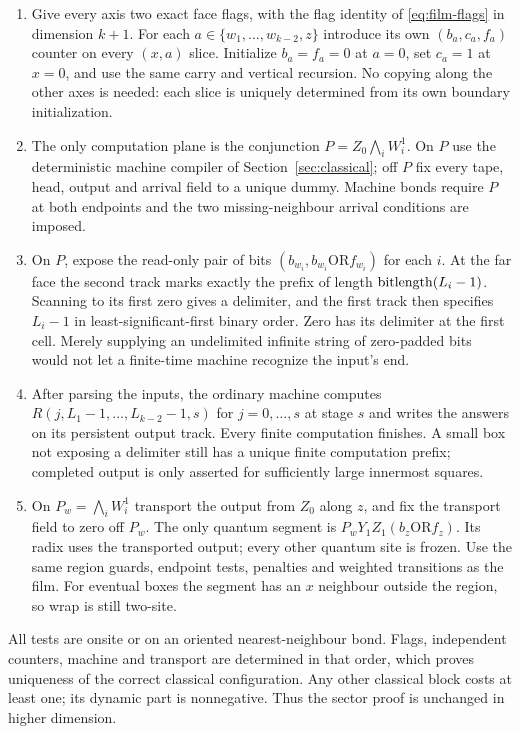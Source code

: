 \begin{enumerate}
\item Give every axis two exact face flags, with the flag identity
of \eqref{eq:film-flags} in dimension $k+1$. For each
$a\in\{w_1,\ldots,w_{k-2},z\}$ introduce its own $(b_a,c_a,f_a)$
counter on every $(x,a)$ slice. Initialize $b_a=f_a=0$ at $a=0$,
set $c_a=1$ at $x=0$, and use the same carry and vertical recursion.
No copying along the other axes is needed: each slice is uniquely
determined from its own boundary initialization.
\item The only computation plane is the conjunction
$P=Z_0\bigwedge_i W_i^1$. On $P$ use the deterministic machine
compiler of Section~\ref{sec:classical}; off $P$ fix every tape,
head, output and arrival field to a unique dummy. Machine bonds
require $P$ at both endpoints and the two missing-neighbour arrival
conditions are imposed.
\item On $P$, expose the read-only pair of bits
$(b_{w_i},b_{w_i}\mathbin{\mathrm{OR}}f_{w_i})$ for each $i$.
At the far face the second track marks exactly the prefix of length
$\operatorname{bitlength}(L_i-1)$. Scanning to its first zero gives a delimiter,
and the first track then specifies $L_i-1$ in least-significant-first
binary order. Zero has its delimiter at the first cell. Merely
supplying an undelimited infinite string of zero-padded bits would
not let a finite-time machine recognize the input's end.
\item After parsing the inputs, the ordinary machine computes
$R(j,L_1-1,\ldots,L_{k-2}-1,s)$ for $j=0,\ldots,s$ at stage $s$
and writes the answers on its persistent output track. Every finite
computation finishes. A small box not exposing a delimiter still
has a unique finite computation prefix; completed output is only
asserted for sufficiently large innermost squares.
\item On $P_w=\bigwedge_iW_i^1$ transport the output from $Z_0$
along $z$, and fix the transport field to zero off $P_w$. The only
quantum segment is
$P_wY_1Z_1(b_z\mathbin{\mathrm{OR}}f_z)$. Its radix uses the
transported output; every other quantum site is frozen. Use the
same region guards, endpoint tests, penalties and weighted
transitions as the film. For eventual boxes the segment has an
$x$ neighbour outside the region, so wrap is still two-site.
\end{enumerate}

All tests are onsite or on an oriented nearest-neighbour bond.
Flags, independent counters, machine and transport are determined
in that order, which proves uniqueness of the correct classical
configuration. Any other classical block costs at least one;
its dynamic part is nonnegative. Thus the sector proof is unchanged
in higher dimension.

